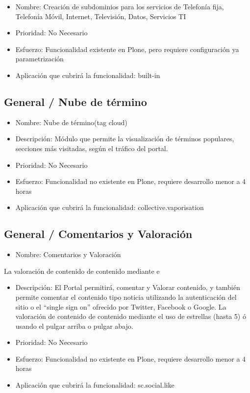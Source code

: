 \documentclass[11pt, letterpaper, oneside, spanish]{scrbook}
\begin{document}
\begin{itemize}
\item Nombre: Creación de subdominios para los servicios de Telefonía fija,
  Telefonía Móvil, Internet, Televisión, Datos, Servicios TI
\item Prioridad: No Necesario
\item Esfuerzo: Funcionalidad existente en Plone, pero requiere configuración ya
  parametrización
\item Aplicación que cubrirá la funcionalidad:  built-in
\end{itemize}
\subsection{General / Nube de término}
\label{sec-2-1-58}

\begin{itemize}
\item Nombre: Nube de término(tag cloud)
\item Descripción: Módulo que permite la visualización de términos populares,
  secciones más visitadas, según el tráfico del portal.
\item Prioridad: No Necesario
\item Esfuerzo: Funcionalidad no existente en Plone, requiere desarrollo menor a 4
  horas
\item Aplicación que cubrirá la funcionalidad: collective.vaporisation
\end{itemize}
\subsection{General / Comentarios y Valoración}
\label{sec-2-1-59}

\begin{itemize}
\item Nombre: Comentarios y Valoración
\end{itemize}
La valoración de contenido de contenido mediante e
\begin{itemize}
\item Descripción: El Portal permitirá, comentar y Valorar contenido, y también
  permite comentar el contenido tipo noticia utilizando la autenticación del
  sitio o el “single sign on” ofrecido por Twitter, Facebook o Google. La
  valoración de contenido de contenido mediante el uso de estrellas (hasta 5)
  ó usando el pulgar arriba o pulgar abajo.
\item Prioridad: No Necesario
\item Esfuerzo: Funcionalidad no existente en Plone, requiere desarrollo menor a 4
  horas
\item Aplicación que cubrirá la funcionalidad: sc.social.like
\end{itemize}
\end{document}
